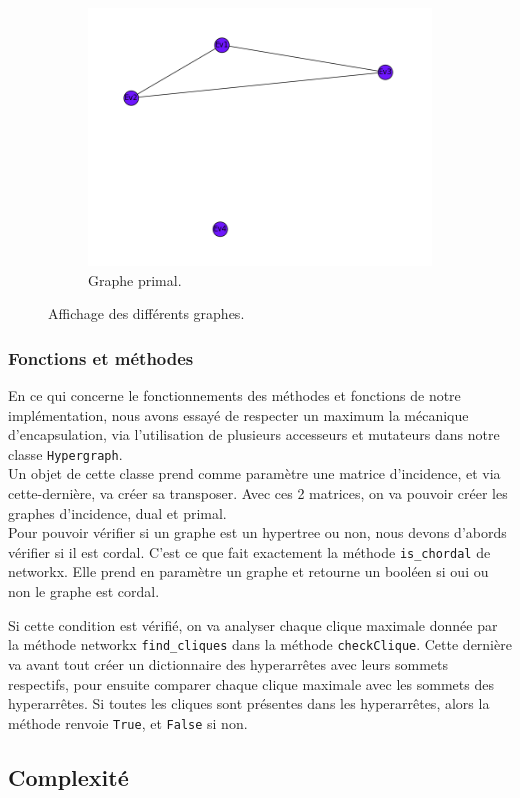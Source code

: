 \documentclass[a4papper]{article}
\begin{document}
\begin{figure}[h!]
\begin{subfigure}[b]{0.45\linewidth}
  	\end{subfigure}
  	\begin{subfigure}[b]{0.5\linewidth}
		\includegraphics[width=\linewidth]{graphe_primal.png}
  		\caption{Graphe primal.}
  	\end{subfigure}
  	\caption{Affichage des différents graphes.}
\end{figure}

		\subsubsection{Fonctions et méthodes}
			En ce qui concerne le fonctionnements des méthodes et fonctions de notre implémentation, nous avons essayé de respecter un maximum la mécanique d'encapsulation, via l'utilisation de plusieurs accesseurs et mutateurs dans notre classe \texttt{Hypergraph}.\\
			
			Un objet de cette classe prend comme paramètre une matrice d'incidence, et via cette-dernière, va créer sa transposer. Avec ces 2 matrices, on va pouvoir créer les graphes d'incidence, dual et primal.\\
			
			Pour pouvoir vérifier si un graphe est un hypertree ou non, nous devons d'abords vérifier si il est cordal. C'est ce que fait exactement la méthode \texttt{is\_chordal} de networkx. Elle prend en paramètre un graphe et retourne un booléen si oui ou non le graphe est cordal. 
			
			Si cette condition est vérifié, on va analyser chaque clique maximale donnée par la méthode networkx \texttt{find\_cliques} dans la méthode \texttt{checkClique}. Cette dernière va avant tout créer un dictionnaire des hyperarrêtes avec leurs sommets respectifs, pour ensuite comparer chaque clique maximale avec les sommets des hyperarrêtes. Si toutes les cliques sont présentes dans les hyperarrêtes, alors la méthode renvoie \texttt{True}, et \texttt{False} si non.
			

	\subsection{Complexité}	
			


\newpage
\tableofcontents
\end{document}
